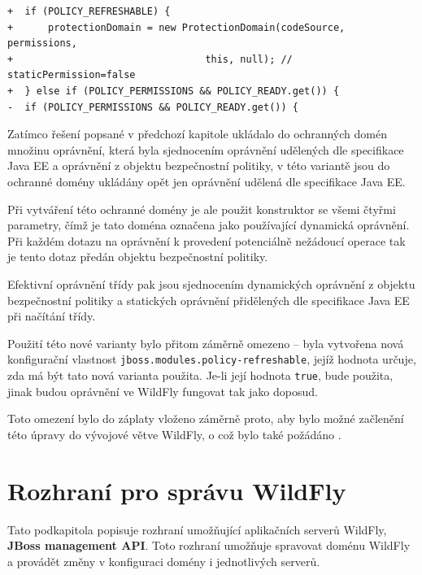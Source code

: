 \begin{lstlisting}[caption=Hlavní část záplaty umožňující nastavit používání dynamických oprávnění, label=refreshable]
+  if (POLICY_REFRESHABLE) {
+      protectionDomain = new ProtectionDomain(codeSource, permissions,
+                                 this, null); // staticPermission=false
+  } else if (POLICY_PERMISSIONS && POLICY_READY.get()) {
-  if (POLICY_PERMISSIONS && POLICY_READY.get()) {
\end{lstlisting}

Zatímco řešení popsané v předchozí kapitole ukládalo do ochranných domén množinu oprávnění,
která byla sjednocením oprávnění udělených dle specifikace Java EE a oprávnění z objektu bezpečnostní politiky,
v této variantě jsou do ochranné domény ukládány opět jen oprávnění udělená dle specifikace Java EE.

Při vytváření této ochranné domény je ale použit konstruktor se všemi čtyřmi parametry, čímž je tato doména označena jako používající dynamická oprávnění.
Při každém dotazu na oprávnění k provedení potenciálně nežádoucí operace tak je tento dotaz předán objektu bezpečnostní politiky.

Efektivní oprávnění třídy pak jsou sjednocením dynamických oprávnění z objektu bezpečnostní politiky a statických oprávnění přidělených dle specifikace Java EE při načítání třídy.

Použití této nové varianty bylo přitom záměrně omezeno -- byla vytvořena nová konfigurační vlastnost {\tt jboss.modules.policy-refreshable},
jejíž hodnota určuje, zda má být tato nová varianta použita. Je-li její hodnota {\tt true}, bude použita,
jinak budou oprávnění ve WildFly fungovat tak jako doposud.

Toto omezení bylo do záplaty vloženo záměrně proto, aby bylo možné začlenění této úpravy do vývojové větve WildFly, o což bylo také požádáno \cite{jmPullRequest}.

\section{Rozhraní pro správu WildFly} \label{managementAPI}

Tato podkapitola popisuje rozhraní umožňující aplikačních serverů WildFly, {\bf JBoss management API}.
Toto rozhraní umožňuje spravovat doménu WildFly a provádět změny v konfiguraci domény i jednotlivých serverů.
\cite{jbossDetypedManagement}

